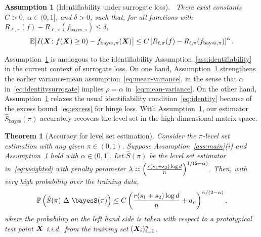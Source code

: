 \documentclass[12pt]{article}
\newtheorem{thm}{Theorem}[section]
\newtheorem{assumption}{Assumption}
\begin{document}
\begin{assumption}[Identifiability under surrogate loss]~\label{ass:identifiable}
There exist constants $C>0$, $\alpha\in(0,1]$, and $\delta>0$, such that, for all functions with $R_{\ell,\pi}(f)-R_{\ell,\pi}(f_{\text{bayes},\pi}) \leq \delta$, 
\begin{equation}\label{eq:identitysurrogate}
\mathbb{E} \big|I(\bm X\colon f(\bm X)\geq 0) - f_{\text{bayes},\pi}(\bm X)\big| \leq C\left[R_{\ell,\pi}(f)-R_{\ell,\pi}(f_{\text{bayes},\pi})\right]^\alpha.
\end{equation}
\end{assumption}

Assumption~\ref{ass:identifiable} is analogous to the identifiability Assumption~\ref{ass:identifiability} in the current context of surrogate loss. On one hand, Assumption~\ref{ass:identifiable} strengthens the earlier variance-mean assumption~\eqref{eq:mean-variance}, in the sense that $\alpha$ in~\eqref{eq:identitysurrogate} implies $\rho=\alpha$ in~\eqref{eq:mean-variance}. On the other hand, Assumption~\ref{ass:identifiable} relaxes the usual identifiability condition~\eqref{eq:identity} because of the excess bound~\eqref{eq:excess} for hinge loss. With Assumption~\ref{ass:identifiable}, our estimator $\hat S_\text{bayes}(\pi)$ accurately recovers the level set in the high-dimensional matrix space. 

\begin{thm}[Accuracy for level set estimation]\label{thm:level}
Consider the $\pi$-level set estimation with any given $\pi\in(0,1)$. Suppose Assumption~\ref{ass:main}(i) and Assumption~\ref{ass:identifiable} hold with $\alpha\in(0,1]$. Let $\hat S(\pi)$ be the level set estimator in~\eqref{eq:weighted} with penalty parameter $\lambda\asymp \left( r(s_1+s_2)\log d \over n\right)^{1/(2-\alpha)}$. Then, with very high probability over the training data, 
\begin{equation}\label{eq:levelset}
\mathbb{P}\left( \hat S(\pi) \ \Delta \ \bayesS(\pi)\right) \leq C\left({r(s_1+s_2)\log d \over n}+a_n\right)^{\alpha/(2-\alpha)},
\end{equation}
where the probability on the left hand side is taken with respect to a prototypical test point $\bm X$ i.i.d.\ from the training set $(\bm X_i)_{i=1}^n$.
\end{thm}
\end{document}
